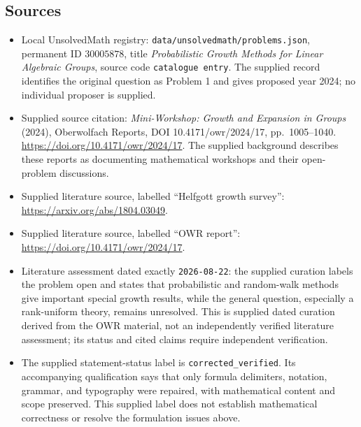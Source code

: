 \documentclass[11pt]{article}
\begin{document}
\subsection{Sources}
\begin{itemize}
\item Local UnsolvedMath registry: \texttt{data/unsolvedmath/problems.json}, permanent ID \(30005878\), title \emph{Probabilistic Growth Methods for Linear Algebraic Groups}, source code \texttt{catalogue entry}. The supplied record identifies the original question as Problem 1 and gives proposed year 2024; no individual proposer is supplied.
\item Supplied source citation: \emph{Mini-Workshop: Growth and Expansion in Groups} (2024), Oberwolfach Reports, DOI 10.4171/owr/2024/17, pp.\ 1005--1040. \url{https://doi.org/10.4171/owr/2024/17}. The supplied background describes these reports as documenting mathematical workshops and their open-problem discussions.
\item Supplied literature source, labelled ``Helfgott growth survey'': \url{https://arxiv.org/abs/1804.03049}.
\item Supplied literature source, labelled ``OWR report'': \url{https://doi.org/10.4171/owr/2024/17}.
\item Literature assessment dated exactly \texttt{2026-08-22}: the supplied curation labels the problem open and states that probabilistic and random-walk methods give important special growth results, while the general question, especially a rank-uniform theory, remains unresolved. This is supplied dated curation derived from the OWR material, not an independently verified literature assessment; its status and cited claims require independent verification.
\item The supplied statement-status label is \texttt{corrected\_verified}. Its accompanying qualification says that only formula delimiters, notation, grammar, and typography were repaired, with mathematical content and scope preserved. This supplied label does not establish mathematical correctness or resolve the formulation issues above.
\end{itemize}
\end{document}

